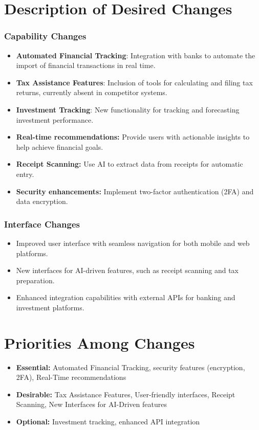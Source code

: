 \section{Description of Desired Changes}
\subsubsection{Capability Changes}
\begin{itemize}
    \item \textbf{Automated Financial Tracking}: Integration with banks to automate the import of financial transactions in real time.
    \item \textbf{Tax Assistance Features}: Inclusion of tools for calculating and filing tax returns, currently absent in competitor systems.
    \item \textbf{Investment Tracking}: New functionality for tracking and forecasting investment performance.
    \item \textbf{Real-time recommendations:} Provide users with actionable insights to help achieve financial goals.
    \item \textbf{Receipt Scanning:} Use AI to extract data from receipts for automatic entry.
    \item \textbf{Security enhancements:} Implement two-factor authentication (2FA) and data encryption.
\end{itemize}


\subsubsection{Interface Changes}
\begin{itemize}
    \item Improved user interface with seamless navigation for both mobile and web platforms.
    \item New interfaces for AI-driven features, such as receipt scanning and tax preparation.
    \item Enhanced integration capabilities with external APIs for banking and investment platforms.
\end{itemize}

\section{Priorities Among Changes}
\begin{itemize}
    \item \textbf{Essential:} Automated Financial Tracking, security features (encryption, 2FA), Real-Time recommendations
    \item \textbf{Desirable:} Tax Assistance Features, User-friendly interfaces, Receipt Scanning, New Interfaces for AI-Driven features
    \item \textbf{Optional:} Investment tracking, enhanced API integration
\end{itemize}


